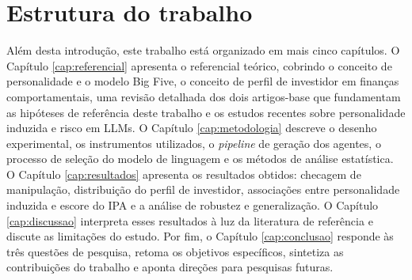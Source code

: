 \section{Estrutura do trabalho}

Além desta introdução, este trabalho está organizado em mais cinco
capítulos. O Capítulo \ref{cap:referencial} apresenta o referencial
teórico, cobrindo o conceito de personalidade e o modelo Big Five, o
conceito de perfil de investidor em finanças comportamentais, uma
revisão detalhada dos dois artigos-base que fundamentam as hipóteses de
referência deste trabalho e os estudos recentes sobre personalidade
induzida e risco em LLMs. O Capítulo \ref{cap:metodologia} descreve o
desenho experimental, os instrumentos utilizados, o \textit{pipeline} de
geração dos agentes, o processo de seleção do modelo de linguagem e os
métodos de análise estatística. O Capítulo \ref{cap:resultados}
apresenta os resultados obtidos: checagem de manipulação, distribuição
do perfil de investidor, associações entre personalidade induzida e
escore do IPA e a análise de robustez e generalização. O Capítulo
\ref{cap:discussao} interpreta esses resultados à luz da literatura de
referência e discute as limitações do estudo. Por fim, o Capítulo
\ref{cap:conclusao} responde às três questões de pesquisa, retoma os
objetivos específicos, sintetiza as contribuições do trabalho e aponta
direções para pesquisas futuras.
